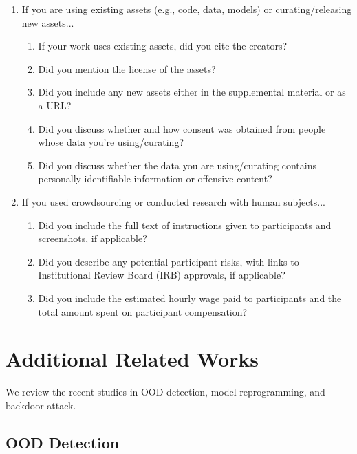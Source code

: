 \documentclass{article}
\begin{document}
\begin{enumerate}
\item If you are using existing assets (e.g., code, data, models) or curating/releasing new assets...
\begin{enumerate}
  \item If your work uses existing assets, did you cite the creators?
    \answerNA{}
  \item Did you mention the license of the assets?
    \answerNA{}
  \item Did you include any new assets either in the supplemental material or as a URL?
    \answerNo{}
  \item Did you discuss whether and how consent was obtained from people whose data you're using/curating?
  \item Did you discuss whether the data you are using/curating contains personally identifiable information or offensive content?
\end{enumerate}

\item If you used crowdsourcing or conducted research with human subjects...
\begin{enumerate}
  \item Did you include the full text of instructions given to participants and screenshots, if applicable?
    \answerNA{}
  \item Did you describe any potential participant risks, with links to Institutional Review Board (IRB) approvals, if applicable?
    \answerNA{}
  \item Did you include the estimated hourly wage paid to participants and the total amount spent on participant compensation?
    \answerNA{}
\end{enumerate}

\end{enumerate}




\appendix
\onecolumn

\section{Additional Related Works} \label{app:related work}

We review the recent studies in OOD detection, model reprogramming, and backdoor attack. 

\subsection{OOD Detection}
\end{document}
